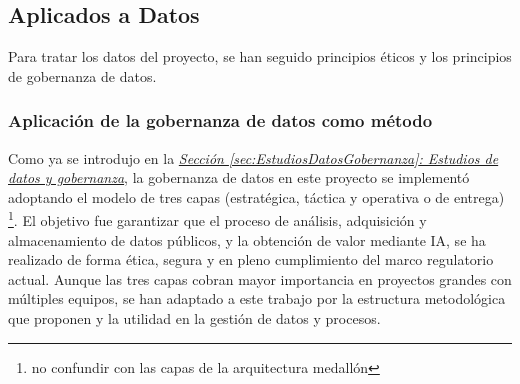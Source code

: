 \subsection{Aplicados a Datos} \label{sec:Metodos_datos}

Para tratar los datos del proyecto, se han seguido principios éticos y los principios de gobernanza de datos.

\subsubsection{Aplicación de la gobernanza de datos como método} \label{sec:Metodos_Gobernanza}

Como ya se introdujo en la \hyperref[sec:EstudiosDatosGobernanza]{\textit{Sección \ref*{sec:EstudiosDatosGobernanza}: Estudios de datos y gobernanza}}, la gobernanza de datos en este proyecto se implementó adoptando el modelo de tres capas (estratégica, táctica y operativa o de entrega) \footnote{no confundir con las capas de la arquitectura medallón}. El objetivo fue garantizar que el proceso de análisis, adquisición y almacenamiento de datos públicos, y la obtención de valor mediante IA, se ha realizado de forma ética, segura y en pleno cumplimiento del marco regulatorio actual. Aunque las tres capas cobran mayor importancia en proyectos grandes con múltiples equipos, se han adaptado a este trabajo por la estructura metodológica que proponen y la utilidad en la gestión de datos y procesos.

